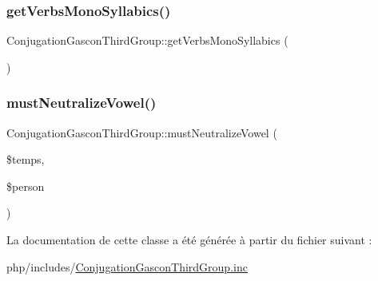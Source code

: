 \hypertarget{class_conjugation_gascon_third_group_ae77d3521103e064d1166a896d78938cc}{}\label{class_conjugation_gascon_third_group_ae77d3521103e064d1166a896d78938cc} 
\subsubsection{\texorpdfstring{get\+Verbs\+Mono\+Syllabics()}{getVerbsMonoSyllabics()}}
{\footnotesize\ttfamily Conjugation\+Gascon\+Third\+Group\+::get\+Verbs\+Mono\+Syllabics (\begin{DoxyParamCaption}{ }\end{DoxyParamCaption})\hspace{0.3cm}{\ttfamily [protected]}}

\hypertarget{class_conjugation_gascon_third_group_ab70a4b2011631eb73f3c1e20ee3fe19b}{}\label{class_conjugation_gascon_third_group_ab70a4b2011631eb73f3c1e20ee3fe19b} 
\subsubsection{\texorpdfstring{must\+Neutralize\+Vowel()}{mustNeutralizeVowel()}}
{\footnotesize\ttfamily Conjugation\+Gascon\+Third\+Group\+::must\+Neutralize\+Vowel (\begin{DoxyParamCaption}\item[{}]{\$temps,  }\item[{}]{\$person }\end{DoxyParamCaption})\hspace{0.3cm}{\ttfamily [protected]}}



La documentation de cette classe a été générée à partir du fichier suivant \+:\begin{DoxyCompactItemize}
\item 
php/includes/\hyperlink{_conjugation_gascon_third_group_8inc}{Conjugation\+Gascon\+Third\+Group.\+inc}\end{DoxyCompactItemize}
